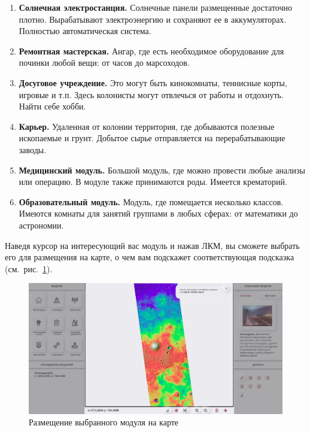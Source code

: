 \begin{enumerate}
	\item \textbf{Солнечная электростанция.} Солнечные панели размещенные достаточно плотно. Вырабатывают электроэнергию и сохраняют ее в аккумуляторах. Полностью автоматическая система.
	
	\item \textbf{Ремонтная мастерская.} Ангар, где есть необходимое оборудование для починки любой вещи: от часов до марсоходов.
	
	\item \textbf{Досуговое учреждение.} Это могут быть кинокомнаты, теннисные корты, игровые и т.п. Здесь колонисты могут отвлечься от работы и отдохнуть. Найти себе хобби.
	
	\item \textbf{Карьер.} Удаленная от колонии территория, где добываются полезные ископаемые и грунт. Добытое сырье отправляется на перерабатывающие заводы.
	
	\item \textbf{Медицинский модуль.} Большой модуль, где можно провести любые анализы или операцию. В модуле также принимаются роды. Имеется крематорий.
	
	\item \textbf{Образовательный модуль.} Модуль, где помещается несколько классов. Имеются комнаты для занятий группами в любых сферах: от математики до астрономии.
\end{enumerate}

Наведя курсор на интересующий вас модуль и нажав ЛКМ, вы сможете выбрать его для размещения на карте, о чем вам подскажет соответствующая подсказка (см.~рис.~\ref{fig:choose_module}).

\begin{figure}[h!]
	\centering
	\includegraphics[width=\linewidth]{./img/choose_module}
	\caption{Размещение выбранного модуля на карте}\label{fig:choose_module}
\end{figure}


